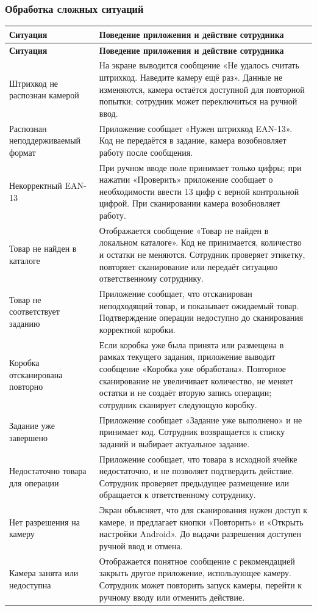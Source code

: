 \subsubsection{Обработка сложных ситуаций}

\begin{longtable}{L{44mm}L{112mm}}
\toprule
\textbf{Ситуация} & \textbf{Поведение приложения и действие сотрудника} \\
\midrule
\endfirsthead
\toprule
\textbf{Ситуация} & \textbf{Поведение приложения и действие сотрудника} \\
\midrule
\endhead
Штрихкод не распознан камерой & На экране выводится сообщение «Не удалось считать штрихкод. Наведите камеру ещё раз». Данные не изменяются, камера остаётся доступной для повторной попытки; сотрудник может переключиться на ручной ввод. \\
Распознан неподдерживаемый формат & Приложение сообщает «Нужен штрихкод EAN-13». Код не передаётся в задание, камера возобновляет работу после сообщения. \\
Некорректный EAN-13 & При ручном вводе поле принимает только цифры; при нажатии «Проверить» приложение сообщает о необходимости ввести 13 цифр с верной контрольной цифрой. При сканировании камера возобновляет работу. \\
Товар не найден в каталоге & Отображается сообщение «Товар не найден в локальном каталоге». Код не принимается, количество и остатки не меняются. Сотрудник проверяет этикетку, повторяет сканирование или передаёт ситуацию ответственному сотруднику. \\
Товар не соответствует заданию & Приложение сообщает, что отсканирован неподходящий товар, и показывает ожидаемый товар. Подтверждение операции недоступно до сканирования корректной коробки. \\
Коробка отсканирована повторно & Если коробка уже была принята или размещена в рамках текущего задания, приложение выводит сообщение «Коробка уже обработана». Повторное сканирование не увеличивает количество, не меняет остатки и не создаёт вторую запись операции; сотрудник сканирует следующую коробку. \\
Задание уже завершено & Приложение сообщает «Задание уже выполнено» и не принимает код. Сотрудник возвращается к списку заданий и выбирает актуальное задание. \\
Недостаточно товара для операции & Приложение сообщает, что товара в исходной ячейке недостаточно, и не позволяет подтвердить действие. Сотрудник проверяет предыдущее размещение или обращается к ответственному сотруднику. \\
Нет разрешения на камеру & Экран объясняет, что для сканирования нужен доступ к камере, и предлагает кнопки «Повторить» и «Открыть настройки Android». До выдачи разрешения доступен ручной ввод и отмена. \\
Камера занята или недоступна & Отображается понятное сообщение с рекомендацией закрыть другое приложение, использующее камеру. Сотрудник может повторить запуск камеры, перейти к ручному вводу или отменить действие. \\
\bottomrule
\end{longtable}
